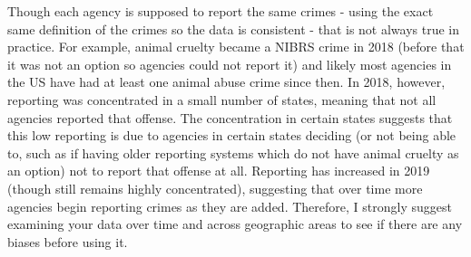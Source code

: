 \documentclass[
]{krantz}
\begin{document}
Though each agency is supposed to report the same crimes -
using the exact same definition of the crimes so the data is
consistent - that is not always true in practice. For
example, animal cruelty became a NIBRS crime in 2018 (before
that it was not an option so agencies could not report it)
and likely most agencies in the US have had at least one
animal abuse crime since then. In 2018, however, reporting
was concentrated in a small number of states, meaning that
not all agencies reported that offense. The concentration in
certain states suggests that this low reporting is due to
agencies in certain states deciding (or not being able to,
such as if having older reporting systems which do not have
animal cruelty as an option) not to report that offense at
all. Reporting has increased in 2019 (though still remains
highly concentrated), suggesting that over time more
agencies begin reporting crimes as they are added.
Therefore, I strongly suggest examining your data over time
and across geographic areas to see if there are any biases
before using it.
\end{document}
